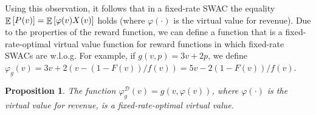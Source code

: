 \documentclass[11pt,letterpaper]{article}
\newcommand{\sqbr}[1]{\left[ #1 \right]}
\newcommand{\brackets}[1]{\left( #1 \right)}
\newcommand{\fr}{fixed-rate\xspace}
\newcommand{\swac}{SWAC\xspace}
\newcommand{\swacs}{SWACs\xspace}
\DeclareMathOperator*{\E}{\bb{E}}
\newcommand{\bb}[1]{\mathbb{#1}}
\DeclareMathOperator{\D}{\mathcal{D}}
\newcommand{\g}{g}
\theoremstyle{plain}
\newtheorem{proposition}[theorem]{Proposition}
\begin{document}
Using this observation, it follows that in a \fr \swac the equality $\E\sqbr{\p{v}}=\E\sqbr{\varphi(v)\x{v}}$ holds (where $\varphi(\cdot)$ is the virtual value for revenue). Due to the properties of the reward function, we can define a function that is a \fr-optimal virtual value function for reward functions in which \fr \swacs are w.l.o.g. For example, if $\g(v,p)=3v+2p$, we define $\varphi_{\g}(v)=3v+2\brackets{v-{(1-F(v))}/{f(v)}}=5v-2{(1-F(v))}/{f(v)}$.


\begin{proposition}\label{prop:generelized-virv}
    The function $\varphi_{\g}^{\D}(v)=\g\brackets{v,\varphi(v)}$, where $\varphi(\cdot)$ is the virtual value for revenue, is a \fr-optimal virtual value.
\end{proposition}
\end{document}
